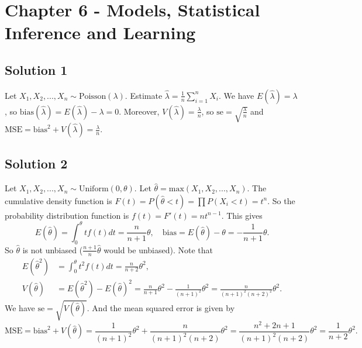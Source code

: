 \section*{Chapter 6 - Models, Statistical Inference and Learning}

\subsection*{Solution 1}

Let $X_1, X_2, ..., X_n \sim \mathrm{Poisson}(\lambda)$.
Estimate $\hat{\lambda} = \frac{1}{n} \sum_{i = 1}^n X_i$.
We have $E(\hat{\lambda}) = \lambda$, so $\mathrm{bias}(\hat{\lambda}) = E(\hat{\lambda}) - \lambda = 0$.
Moreover, $V(\hat{\lambda}) = \frac{\lambda}{n}$, so $\mathrm{se} = \sqrt{\frac{\lambda}{n}}$ and $\mathrm{MSE} = \mathrm{bias}^2 + V(\hat{\lambda}) = \frac{\lambda}{n}$.


\subsection*{Solution 2}

Let $X_1, X_2, ..., X_n \sim \mathrm{Uniform}(0, \theta)$.
Let $\hat{\theta} = \mathrm{max}(X_1, X_2, ..., X_n)$.
The cumulative density function is $F(t) = P(\hat{\theta} < t) = \prod P(X_i < t) = t^n$.
So the probability distribution function is $f(t) = F'(t) = nt^{n-1}$.
This gives
\begin{equation*}
    E(\hat{\theta}) = \int_0^{\theta} tf(t) dt = \frac{n}{n+1} \theta, \quad
    \mathrm{bias} = E(\hat{\theta}) - \theta = - \frac{1}{n+1} \theta.
\end{equation*}
So $\hat{\theta}$ is not unbiased ($\frac{n+1}{n} \hat{\theta}$ would be unbiased).
Note that
\begin{equation*}
    \begin{split}
        E(\hat{\theta}^2) &= \int_0^{\theta} t^2 f(t) dt
            = \frac{n}{n+2} \theta^2, \\
        V(\hat{\theta}) &= E(\hat{\theta}^2) - E(\hat{\theta})^2
            = \frac{n}{n+1} \theta^2 - \frac{1}{(n+1)^2} \theta^2
            = \frac{n}{(n+1)^2 (n+2)^2} \theta^2.
    \end{split}
\end{equation*}
We have $\mathrm{se} = \sqrt{V(\hat{\theta})}$.
And the mean squared error is given by
\begin{equation*}
    \mathrm{MSE} = \mathrm{bias}^2 + V(\hat{\theta})
        = \frac{1}{(n+1)^2} \theta^2 + \frac{n}{(n+1)^2 (n+2)} \theta^2
        = \frac{n^2 + 2n + 1}{(n+1)^2 (n+2)} \theta^2
        = \frac{1}{n + 2} \theta^2.
\end{equation*}



